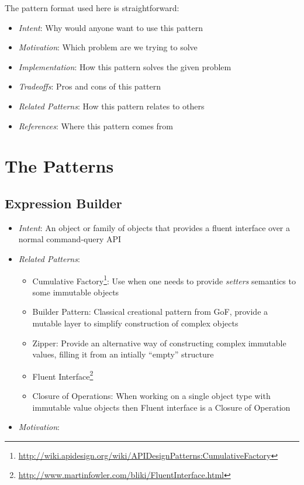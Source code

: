 \documentclass[11pt,]{article}
\renewcommand{\href}[2]{#2\footnote{\url{#1}}}
\begin{document}
The pattern format used here is straightforward:

\begin{itemize}
\item
  \emph{Intent}: Why would anyone want to use this pattern
\item
  \emph{Motivation}: Which problem are we trying to solve
\item
  \emph{Implementation}: How this pattern solves the given problem
\item
  \emph{Tradeoffs}: Pros and cons of this pattern
\item
  \emph{Related Patterns}: How this pattern relates to others
\item
  \emph{References}: Where this pattern comes from
\end{itemize}

\section{The Patterns}

\subsection{Expression Builder}

\begin{itemize}
\item
  \emph{Intent}: An object or family of objects that provides a fluent
  interface over a normal command-query API
\item
  \emph{Related Patterns}:

  \begin{itemize}
  \item
    \href{http://wiki.apidesign.org/wiki/APIDesignPatterns:CumulativeFactory}{Cumulative
    Factory}: Use when one needs to provide \emph{setters} semantics to
    some immutable objects
  \item
    Builder Pattern: Classical creational pattern from GoF, provide a
    mutable layer to simplify construction of complex objects
  \item
    Zipper: Provide an alternative way of constructing complex immutable
    values, filling it from an intially ``empty'' structure
  \item
    \href{http://www.martinfowler.com/bliki/FluentInterface.html}{Fluent
    Interface}
  \item
    Closure of Operations: When working on a single object type with
    immutable value objects then Fluent interface is a Closure of
    Operation
  \end{itemize}
\item
  \emph{Motivation}:
\end{itemize}
\end{document}
